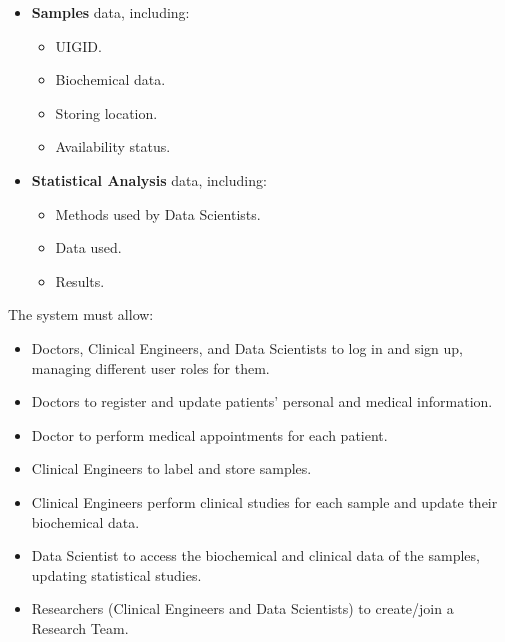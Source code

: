 \begin{itemize}
    \item \textbf{Samples} data, including: 
    \begin{itemize}
        \item UIGID.
        \item Biochemical data.
        \item Storing location.
        \item Availability status. 
    \end{itemize}

    \item \textbf{Statistical Analysis} data, including:
    \begin{itemize}
        \item Methods used by Data Scientists.
        \item Data used.
        \item Results.
    \end{itemize}
    
\end{itemize}
The system must allow:
\begin{itemize}
    \item Doctors, Clinical Engineers, and Data Scientists to log in and sign up, managing different user roles for them.
    \item Doctors to register and update patients' personal and medical information.
    \item Doctor to perform medical appointments for each patient.
    \item Clinical Engineers to label and store samples.
    \item Clinical Engineers perform clinical studies for each sample and update their biochemical data.
    \item Data Scientist to access the biochemical and clinical data of the samples, updating statistical studies.
    \item Researchers (Clinical Engineers and Data Scientists) to create/join a Research Team.
\end{itemize}